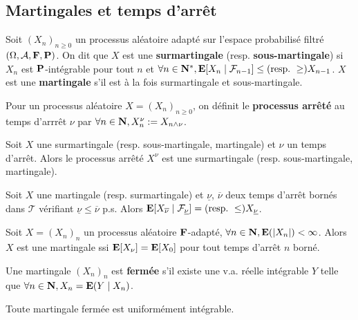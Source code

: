 \subsection{Martingales et temps d'arrêt}

	\begin{defn}
		Soit $(X_n)_{n \geq 0}$ un processus aléatoire adapté sur l'espace probabilisé filtré $(\Omega, \mathcal{A}, \mathbf{F}, \mathbf{P})$.
		On dit que $X$ est une \textbf{surmartingale} (resp. \textbf{sous-martingale}) si $X_n$ est $\mathbf{P}$-intégrable pour tout $n$ et $\forall n \in \mathbf{N}^*, \mathbf{E}[X_n \mid \mathcal{F}_{n - 1}] \leq (\text{resp.}\ \geq) X_{n - 1}$.
		$X$ est une \textbf{martingale} s'il est à la fois surmartingale et sous-martingale.
	\end{defn}

	\begin{defn}
		Pour un processus aléatoire $X = (X_n)_{n \geq 0}$, on définit le \textbf{processus arrêté} au temps d'arrrêt $\nu$ par $\forall n \in \mathbf{N}, X^\nu_n := X_{n \wedge \nu}$.
	\end{defn}
	
	\begin{lem}
		Soit $X$ une surmartingale (resp. sous-martingale, martingale) et $\nu$ un temps d'arrêt.
		Alors le processus arrêté $X^\nu$ est une surmartingale (resp. sous-martingale, martingale).
	\end{lem}

	\begin{thm}
		Soit $X$ une martingale (resp. surmartingale) et $\underline{\nu}$, $\overline{\nu}$ deux temps d'arrêt bornés dans $\mathcal{T}$ vérifiant $\underline{\nu} \leq \overline{\nu}$ p.s.
		Alors $\mathbf{E}[X_{\overline{\nu}} \mid \mathcal{F}_{\underline{\nu}}] = (\text{resp.}\ \leq) X_{\underline{\nu}}$.
	\end{thm}

	\begin{pop}
		Soit $X = (X_n)_n$ un processus aléatoire $\mathbf{F}$-adapté, $\forall n \in \mathbf{N}, \mathbf{E}(\left\lvert X_n\right\rvert) < \infty$.
		Alors $X$ est une martingale ssi $\mathbf{E}[X_\nu] = \mathbf{E}[X_0]$ pour tout temps d'arrêt $n$ borné.
	\end{pop}

	\begin{defn}
		Une martingale $(X_n)_n$ est \textbf{fermée} s'il existe une v.a. réelle intégrable $Y$ telle que $\forall n \in \mathbf{N}, X_n = \mathbf{E}(Y \mid X_n)$.
	\end{defn}
	
	\begin{thm}
		Toute martingale fermée est uniformément intégrable.
	\end{thm}


